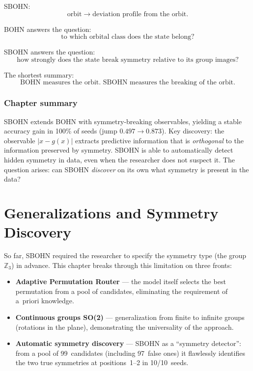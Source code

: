 \documentclass[11pt,a4paper]{report}
\begin{document}
SBOHN:
\[
\text{orbit}\longrightarrow\text{deviation profile from the orbit}.
\]

BOHN answers the question:
\[
\text{to which orbital class does the state belong?}
\]

SBOHN answers the question:
\[
\text{how strongly does the state break symmetry relative to its group images?}
\]

The shortest summary:
\[
\boxed{
\text{BOHN measures the orbit. SBOHN measures the breaking of the orbit.}
}
\]




\subsection*{Chapter summary}
SBOHN extends BOHN with symmetry-breaking observables, yielding a stable accuracy gain in 100\% of seeds (jump $0.497 \to 0.873$). Key discovery: the observable $|x-g(x)|$ extracts predictive information that is \emph{orthogonal} to the information preserved by symmetry. SBOHN is able to automatically detect hidden symmetry in data, even when the researcher does not suspect it. The question arises: can SBOHN \emph{discover} on its own what symmetry is present in the data?

\newpage


\chapter{Generalizations and Symmetry Discovery}

So far, SBOHN required the researcher to specify the symmetry type (the group $\mathbb{Z}_3$) in advance. This chapter breaks through this limitation on three fronts:

\begin{itemize}
\item \textbf{Adaptive Permutation Router} --- the model itself selects the best permutation from a pool of candidates, eliminating the requirement of a~priori knowledge.
\item \textbf{Continuous groups SO(2)} --- generalization from finite to infinite groups (rotations in the plane), demonstrating the universality of the approach.
\item \textbf{Automatic symmetry discovery} --- SBOHN as a ``symmetry detector'': from a pool of 99~candidates (including 97~false ones) it flawlessly identifies the two true symmetries at positions~1--2 in 10/10~seeds.
\end{itemize}
\end{document}
